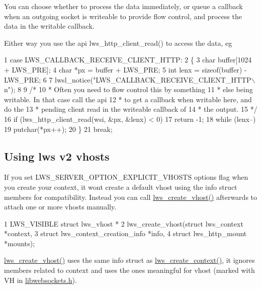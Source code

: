 You can choose whether to process the data immediately, or queue a callback when an outgoing socket is writeable to provide flow control, and process the data in the writable callback.

Either way you use the api {\ttfamily lws\+\_\+http\+\_\+client\+\_\+read()} to access the data, eg


\begin{DoxyCode}
1 case LWS\_CALLBACK\_RECEIVE\_CLIENT\_HTTP:
2         \{
3                 char buffer[1024 + LWS\_PRE];
4                 char *px = buffer + LWS\_PRE;
5                 int lenx = sizeof(buffer) - LWS\_PRE;
6 
7                 lwsl\_notice("LWS\_CALLBACK\_RECEIVE\_CLIENT\_HTTP\(\backslash\)n");
8 
9                 /*
10                  * Often you need to flow control this by something
11                  * else being writable.  In that case call the api
12                  * to get a callback when writable here, and do the
13                  * pending client read in the writeable callback of
14                  * the output.
15                  */
16                 if (lws\_http\_client\_read(wsi, &px, &lenx) < 0)
17                         return -1;
18                 while (lenx--)
19                         putchar(*px++);
20         \}
21         break;
\end{DoxyCode}


\subsection*{Using lws v2 vhosts }

If you set L\+W\+S\+\_\+\+S\+E\+R\+V\+E\+R\+\_\+\+O\+P\+T\+I\+O\+N\+\_\+\+E\+X\+P\+L\+I\+C\+I\+T\+\_\+\+V\+H\+O\+S\+TS options flag when you create your context, it won\textquotesingle{}t create a default vhost using the info struct members for compatibility. Instead you can call \hyperlink{group__context-and-vhost_ga0c54c667ccd9b8b3dddcd123ca72f87c}{lws\+\_\+create\+\_\+vhost()} afterwards to attach one or more vhosts manually.


\begin{DoxyCode}
1 LWS\_VISIBLE struct lws\_vhost *
2 lws\_create\_vhost(struct lws\_context *context,
3                  struct lws\_context\_creation\_info *info,
4                  struct lws\_http\_mount *mounts);
\end{DoxyCode}


\hyperlink{group__context-and-vhost_ga0c54c667ccd9b8b3dddcd123ca72f87c}{lws\+\_\+create\+\_\+vhost()} uses the same info struct as \hyperlink{group__context-and-vhost_gaf2fff58562caab7510c41eeac85a8648}{lws\+\_\+create\+\_\+context()}, it ignores members related to context and uses the ones meaningful for vhost (marked with VH in \hyperlink{libwebsockets_8h}{libwebsockets.\+h}).


